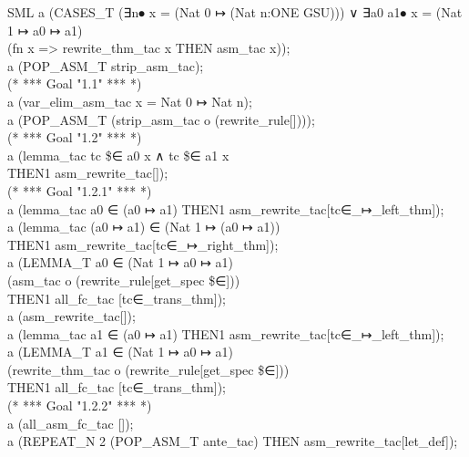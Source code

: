 {\begin{GFT}{SML}
\+a (CASES\_T \PrKM{}(∃n⦁ x = (Nat 0 ↦ (Nat n:ONE GSU))) ∨ ∃a0 a1⦁ x = (Nat 1 ↦ a0 ↦ a1)\PrKO{}\\
\+	(fn x => rewrite\_thm\_tac x THEN asm\_tac x));\\
\+a (POP\_ASM\_T strip\_asm\_tac);\\
\+(* *** Goal "1.1" *** *)\\
\+a (var\_elim\_asm\_tac \PrKM{}x = Nat 0 ↦ Nat n\PrKO{});\\
\+a (POP\_ASM\_T (strip\_asm\_tac o (rewrite\_rule[])));\\
\+(* *** Goal "1.2" *** *)\\
\+a (lemma\_tac \PrKM{}tc \$∈ a0 x ∧ tc \$∈ a1 x\PrKO{}\\
\+	THEN1 asm\_rewrite\_tac[]);\\
\+(* *** Goal "1.2.1" *** *)\\
\+a (lemma\_tac \PrKM{}a0 ∈\PrJL{+} (a0 ↦ a1)\PrKO{} THEN1 asm\_rewrite\_tac[tc∈\_↦\_left\_thm]);\\
\+a (lemma\_tac \PrKM{}(a0 ↦ a1) ∈\PrJL{+} (Nat 1 ↦ (a0 ↦ a1))\PrKO{}\\
\+	THEN1 asm\_rewrite\_tac[tc∈\_↦\_right\_thm]);\\
\+a (LEMMA\_T \PrKM{}a0 ∈\PrJL{+} (Nat 1 ↦ a0 ↦ a1)\PrKO{}\\
\+	(asm\_tac o (rewrite\_rule[get\_spec \PrKM{}\$∈\PrJL{+}\PrKO{}]))\\
\+	THEN1 all\_fc\_tac [tc∈\_trans\_thm]);\\
\+a (asm\_rewrite\_tac[]);\\
\+a (lemma\_tac \PrKM{}a1 ∈\PrJL{+} (a0 ↦ a1)\PrKO{} THEN1 asm\_rewrite\_tac[tc∈\_↦\_left\_thm]);\\
\+a (LEMMA\_T \PrKM{}a1 ∈\PrJL{+} (Nat 1 ↦ a0 ↦ a1)\PrKO{}\\
\+	(rewrite\_thm\_tac o (rewrite\_rule[get\_spec \PrKM{}\$∈\PrJL{+}\PrKO{}]))\\
\+	THEN1 all\_fc\_tac [tc∈\_trans\_thm]);\\
\+(* *** Goal "1.2.2" *** *)\\
\+a (all\_asm\_fc\_tac []);\\
\+a (REPEAT\_N 2 (POP\_ASM\_T ante\_tac) THEN asm\_rewrite\_tac[let\_def]);\\

\end{GFT}}
